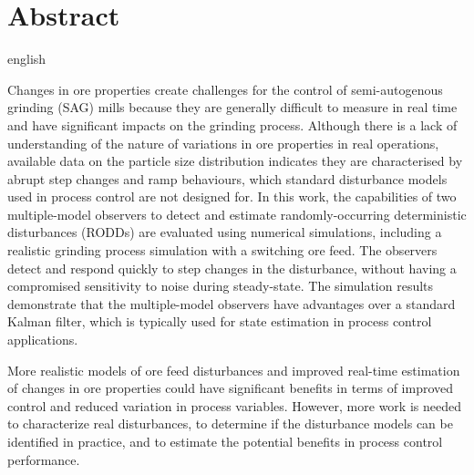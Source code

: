 \chapter*{Abstract}             %
\label{chap-abstract}           %

\begin{otherlanguage*}{english}
  
  Changes in ore properties create challenges for the control of semi-autogenous grinding (SAG) mills because they are generally difficult to measure in real time and have significant impacts on the grinding process. Although there is a lack of understanding of the nature of variations in ore properties in real operations, available data on the particle size distribution indicates they are characterised by abrupt step changes and ramp behaviours, which standard disturbance models used in process control are not designed for. In this work, the capabilities of two multiple-model observers to detect and estimate randomly-occurring deterministic disturbances (\acrshort{RODD}s) are evaluated using numerical simulations, including a realistic grinding process simulation with a switching ore feed. The observers detect and respond quickly to step changes in the disturbance, without having a compromised sensitivity to noise during steady-state. The simulation results demonstrate that the multiple-model observers have advantages over a standard Kalman filter, which is typically used for state estimation in process control applications. 
  
  More realistic models of ore feed disturbances and improved real-time estimation of changes in ore properties could have significant benefits in terms of improved control and reduced variation in process variables. However, more work is needed to characterize real disturbances, to determine if the disturbance models can be identified in practice, and to estimate the potential benefits in process control performance.
\end{otherlanguage*}

